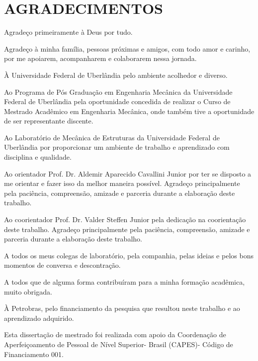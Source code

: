 
\chapter*{\MakeUppercase{Agradecimentos}}


Agradeço primeiramente à Deus por tudo.

Agradeço à minha família, pessoas próximas e amigos, com todo amor e carinho, por me apoiarem, acompanharem e colaborarem nessa jornada.

À Universidade Federal de Uberlândia pelo ambiente acolhedor e diverso.

Ao Programa de Pós Graduação em Engenharia Mecânica da Universidade Federal de Uberlândia pela oportunidade concedida de realizar o Curso de Mestrado Acadêmico em Engenharia
Mecânica, onde também tive a oportunidade de ser representante discente.

Ao Laboratório de Mecânica de Estruturas da Universidade Federal de Uberlândia por proporcionar um ambiente de trabalho e aprendizado com disciplina e qualidade.

Ao orientador Prof. Dr. Aldemir Aparecido Cavallini Junior  por ter se disposto a me orientar e fazer isso da melhor
maneira possível. Agradeço principalmente pela paciência, compreensão, amizade e parceria durante a elaboração deste trabalho.

Ao coorientador Prof. Dr. Valder Steffen Junior pela dedicação na coorientação deste trabalho. Agradeço principalmente pela paciência, compreensão, amizade e parceria durante a elaboração deste trabalho.

A todos os meus colegas de laboratório, pela companhia, pelas ideias e pelos bons momentos de conversa e descontração.

A todos que de alguma forma contribuíram para a minha formação acadêmica, muito
obrigada.

À Petrobras, pelo financiamento da pesquisa que resultou neste trabalho e ao aprendizado adquirido.

Esta dissertação de mestrado foi realizada com apoio da Coordenação de Aperfeiçoamento de Pessoal de Nível Superior- Brasil (CAPES)- Código de Financiamento 001.

